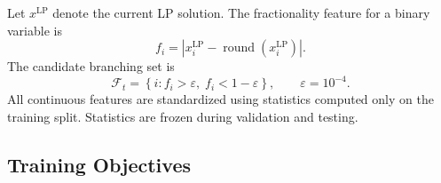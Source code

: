 \documentclass{article}
\newcommand{\fracset}{\mathcal{F}}
\begin{document}
Let $x^{\mathrm{LP}}$ denote the current LP solution. The fractionality feature for a binary variable is
\begin{equation}
    f_i =
    \left|x_i^{\mathrm{LP}}-
    \operatorname{round}(x_i^{\mathrm{LP}})\right|.
\end{equation}
The candidate branching set is
\begin{equation}
    \fracset_t =
    \left\{i:
    f_i>\varepsilon,\;
    f_i<1-\varepsilon
    \right\},
    \qquad
    \varepsilon=10^{-4}.
\end{equation}
All continuous features are standardized using statistics computed only on the training split. Statistics are frozen during validation and testing.

\subsection{Training Objectives}
\label{sec:objectives}
\end{document}
